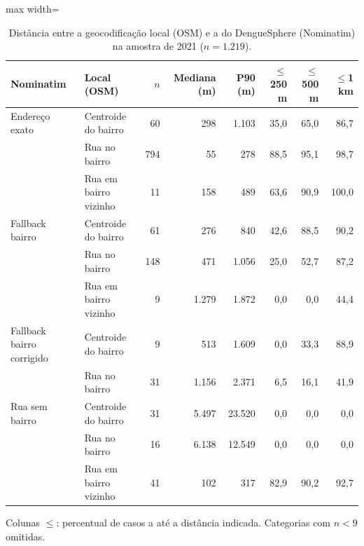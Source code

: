 \begin{table}[htbp]
\centering
\small
\caption{Distância entre a geocodificação local (OSM) e a do DengueSphere (Nominatim) na amostra de 2021 ($n = 1.219$).}
\label{tab:validacao}
\begin{adjustbox}{max width=\linewidth}
\begin{tabular}{llrrrrrr}
\toprule
Nominatim & Local (OSM) & $n$ & Mediana (m) & P90 (m) & $\leq$250 m & $\leq$500 m & $\leq$1 km \\
\midrule
Endereço exato & Centroide do bairro & 60 & 298 & 1.103 & 35,0 & 65,0 & 86,7 \\
 & Rua no bairro & 794 & 55 & 278 & 88,5 & 95,1 & 98,7 \\
 & Rua em bairro vizinho & 11 & 158 & 489 & 63,6 & 90,9 & 100,0 \\
\addlinespace
Fallback bairro & Centroide do bairro & 61 & 276 & 840 & 42,6 & 88,5 & 90,2 \\
 & Rua no bairro & 148 & 471 & 1.056 & 25,0 & 52,7 & 87,2 \\
 & Rua em bairro vizinho & 9 & 1.279 & 1.872 & 0,0 & 0,0 & 44,4 \\
\addlinespace
Fallback bairro corrigido & Centroide do bairro & 9 & 513 & 1.609 & 0,0 & 33,3 & 88,9 \\
 & Rua no bairro & 31 & 1.156 & 2.371 & 6,5 & 16,1 & 41,9 \\
\addlinespace
Rua sem bairro & Centroide do bairro & 31 & 5.497 & 23.520 & 0,0 & 0,0 & 0,0 \\
 & Rua no bairro & 16 & 6.138 & 12.549 & 0,0 & 0,0 & 0,0 \\
 & Rua em bairro vizinho & 41 & 102 & 317 & 82,9 & 90,2 & 92,7 \\
\bottomrule
\end{tabular}
\end{adjustbox}
\par\smallskip\begin{minipage}{0.95\linewidth}\footnotesize Colunas $\leq$: percentual de casos a até a distância indicada. Categorias com $n < 9$ omitidas.\end{minipage}
\end{table}
